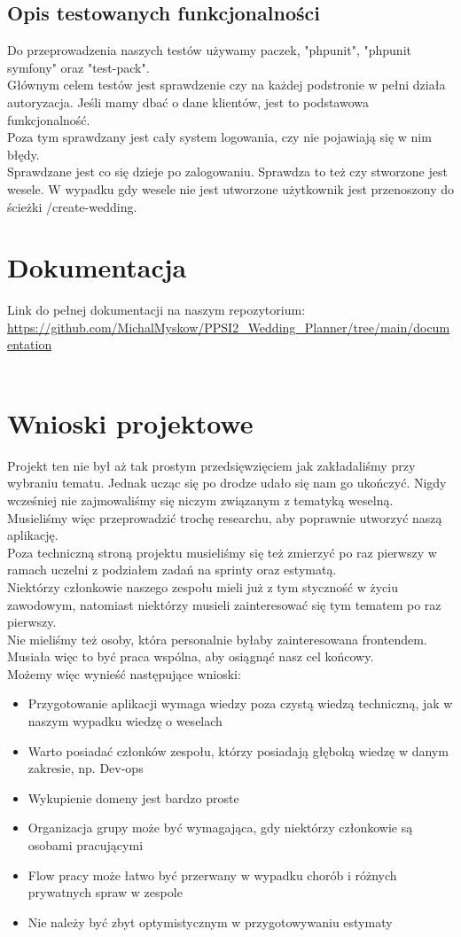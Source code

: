 \documentclass{article}
\begin{document}
\subsection{Opis testowanych funkcjonalności}
Do przeprowadzenia naszych testów używamy paczek, "phpunit", "phpunit symfony" oraz "test-pack".\\
Głównym celem testów jest sprawdzenie czy na każdej podstronie w pełni działa autoryzacja. Jeśli mamy dbać o dane klientów, jest to podstawowa funkcjonalność. \\
Poza tym sprawdzany jest cały system logowania, czy nie pojawiają się w nim błędy. \\
Sprawdzane jest co się dzieje po zalogowaniu. Sprawdza to też czy stworzone jest wesele. W wypadku gdy wesele nie jest utworzone użytkownik jest przenoszony do ścieżki /create-wedding.

\section{Dokumentacja}
Link do pełnej dokumentacji na naszym repozytorium: 
\url{https://github.com/MichalMyskow/PPSI2_Wedding_Planner/tree/main/documentation}\\\\
\section{Wnioski projektowe}
Projekt ten nie był aż tak prostym przedsięwzięciem jak zakładaliśmy przy wybraniu tematu. Jednak ucząc się po drodze udało się nam go ukończyć. Nigdy wcześniej nie zajmowaliśmy się niczym związanym z tematyką weselną. Musieliśmy więc przeprowadzić trochę researchu, aby poprawnie utworzyć naszą aplikację.\\
Poza techniczną stroną projektu musieliśmy się też zmierzyć po raz pierwszy w ramach uczelni z podziałem zadań na sprinty oraz estymatą.\\
Niektórzy członkowie naszego zespołu mieli już z tym styczność w życiu zawodowym, natomiast niektórzy musieli zainteresować się tym tematem po raz pierwszy.\\
Nie mieliśmy też osoby, która personalnie byłaby zainteresowana frontendem. Musiała więc to być praca wspólna, aby osiągnąć nasz cel końcowy.\\
Możemy więc wynieść następujące wnioski:\\
\begin{itemize}
\item Przygotowanie aplikacji wymaga wiedzy poza czystą wiedzą techniczną, jak w naszym wypadku wiedzę o weselach
\item Warto posiadać członków zespołu, którzy posiadają głęboką wiedzę w danym zakresie, np. Dev-ops
\item Wykupienie domeny jest bardzo proste
\item Organizacja grupy może być wymagająca, gdy niektórzy członkowie są osobami pracującymi
\item Flow pracy może łatwo być przerwany w wypadku chorób i różnych prywatnych spraw w zespole
\item Nie należy być zbyt optymistycznym w przygotowywaniu estymaty
\end{itemize}
\end{document}

